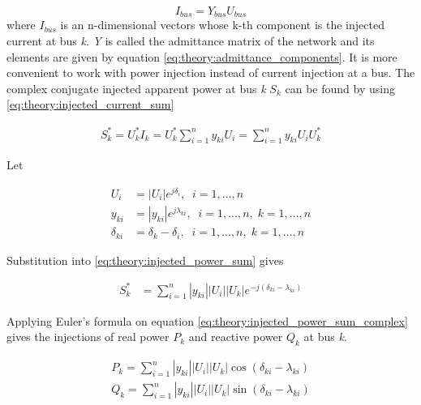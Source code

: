 \documentclass[class=book, crop=false]{standalone}
\begin{document}
\begin{equation}\label{eq:theory:powerflow_busmatrix}
I_{bus} = Y_{bus}U_{bus}
\end{equation}
where $I_{bus}$ is an n-dimensional vectors whose k-th component is the injected current at bus \textit{k}. \textit{Y} is called the admittance matrix of the network and its elements are given by equation \eqref{eq:theory:admittance_components}. It is more convenient to work with power injection instead of current injection at a bus. The complex conjugate injected apparent power at bus \textit{k} $S_{k}$ can be found by using \eqref{eq:theory:injected_current_sum}

\begin{equation}
    \begin{aligned}\label{eq:theory:injected_power_sum}
    S^{*}_{k} = U^{*}_{k}I_{k} = U^{*}_{k}\sum_{i=1}^{n} y_{ki}U_{i}
    = \sum_{i=1}^{n} y_{ki}U_{i}U^{*}_{k}
    \end{aligned} 
\end{equation}


Let

\begin{equation}
    \begin{aligned}\label{eq:theory:injected_power_sum_varialbes}
    U_{i} &= |U_{i}|e^{j\delta_{i}}, \;\; i = 1,...,n \\
    y_{ki} &= |y_{ki}|e^{j\lambda_{ki}}, \;\; i = 1,...,n, \; k = 1,...,n \\
    \delta_{ki} &= \delta_{k} - \delta_{i}, \;\; i = 1,...,n, \; k = 1,...,n 
    \end{aligned} 
\end{equation}


Substitution into \eqref{eq:theory:injected_power_sum} gives 

\begin{equation}
    \begin{aligned}\label{eq:theory:injected_power_sum_complex}
    S^{*}_{k} &= \sum_{i=1}^{n}|y_{ki}||U_{i}||U_{k}|e^{-j(\delta_{ki}-\lambda_{ki})}
    \end{aligned} 
\end{equation}



Applying Euler's formula on equation \eqref{eq:theory:injected_power_sum_complex} gives the injections of real power $P_{k}$ and reactive power $Q_{k}$ at bus \textit{k}.

\begin{equation}
    \begin{aligned}\label{eq:theory:power_flow_equation}
    P_{k} =  \sum_{i=1}^{n}|y_{ki}||U_{i}||U_{k}|\cos{(\delta_{ki}-\lambda_{ki})}
    \\
    Q_{k} =  \sum_{i=1}^{n}|y_{ki}||U_{i}||U_{k}|\sin{(\delta_{ki}-\lambda_{ki})}
    \end{aligned} 
\end{equation}
\end{document}
